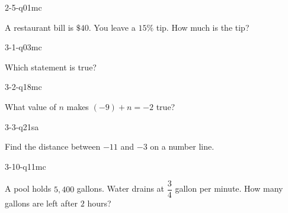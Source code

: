 \begin{practiceQuestion}{2-5-q01}{mc}
\begin{questionText}
A restaurant bill is $\$40$. You leave a $15\%$ tip. How much is the tip?
\end{questionText}
\end{practiceQuestion}

\begin{practiceQuestion}{3-1-q03}{mc}
\begin{questionText}
Which statement is true?
\end{questionText}
\end{practiceQuestion}

\begin{practiceQuestion}{3-2-q18}{mc}
\begin{questionText}
What value of $n$ makes $(-9) + n = -2$ true?
\end{questionText}
\end{practiceQuestion}

\begin{practiceQuestion}{3-3-q21}{sa}
\begin{questionText}
Find the distance between $-11$ and $-3$ on a number line.
\end{questionText}
\end{practiceQuestion}

\begin{practiceQuestion}{3-10-q11}{mc}
\begin{questionText}
A pool holds $5{,}400$ gallons. Water drains at $\dfrac{3}{4}$ gallon per minute. How many gallons are left after $2$ hours?
\end{questionText}
\end{practiceQuestion}

